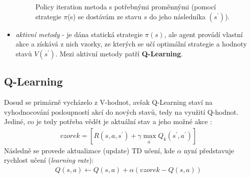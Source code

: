 \begin{itemize}
  \begin{figure}[!htbp]
  \begin{center}
    \caption{Policy iteration metoda s potřebnými proměnnými (pomocí strategie $\pi$(s) se dostávám ze stavu $s$ do jeho následníka $(s^\prime)$).}
    \label{img:policyeval}
  \end{center}
  \end{figure}

  \item \textit{aktivní metody} - je dána statická strategie $\pi(s)$, ale agent provádí vlastní akce a získává z nich vzorky, ze kterých se učí optimální strategie a hodnoty stavů $V(s^\prime)$. Mezi aktivní metody patří \textbf{Q-Learning}.
\end{itemize}

\subsection{Q-Learning}
Dosud se primárně vycházelo z V-hodnot, avšak Q-Learning staví na vyhodnocování posloupností akcí do nových stavů, tedy na využití Q-hodnot. Jediné, co je tedy potřeba vědět je aktuální stav a jeho možné akce \cite{RLIntro}:
\begin{align}
vzorek = \left [ R(s,a,s^\prime)+\gamma \max_{a^\prime}Q_{k}(s^\prime,a^\prime) \right]
\end{align}
Následně se provede aktualizace (update) TD učení, kde $\alpha$ nyní představuje rychlost učení (\textit{learning rate}):
\begin{align}
 Q(s,a) \leftarrow  Q(s,a) + \alpha(vzorek - Q(s,a))
\end{align}


